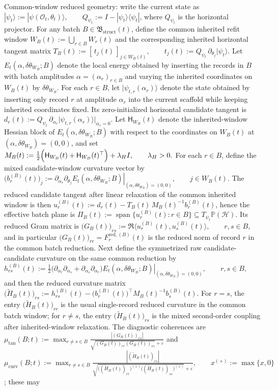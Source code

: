 \documentclass[11pt]{article}
\begin{document}
Common-window reduced geometry: write the current state as \(|\psi_t\rangle:=|\psi(\mathcal O_t,\theta_t)\rangle, \qquad Q_{\psi_t}:=I-|\psi_t\rangle\langle \psi_t|\), where \(Q_{\psi_t}\) is the horizontal projector. For any batch \(B\in \mathfrak B_{\mathrm{struct}}(t)\), define the common inherited refit window \(W_B(t):=\bigcup_{r\in B} W_r(t)\) and the corresponding inherited horizontal tangent matrix \(T_B(t):=[\,t_j(t)\,]_{j\in W_B(t)}, \qquad t_j(t):=Q_{\psi_t}\,\partial_{\theta_j}|\psi_t\rangle\). Let \(E_t(\alpha,\delta\theta_{W_B};B)\) denote the local energy obtained by inserting the records in \(B\) with batch amplitudes \(\alpha=(\alpha_r)_{r\in B}\) and varying the inherited coordinates on \(W_B(t)\) by \(\delta\theta_{W_B}\). For each \(r\in B\), let \(|\psi_{t,r}(\alpha_r)\rangle\) denote the state obtained by inserting only record \(r\) at amplitude \(\alpha_r\) into the current scaffold while keeping inherited coordinates fixed. Its zero-initialized horizontal candidate tangent is \(d_r(t):=Q_{\psi_t}\,\partial_{\alpha_r}|\psi_{t,r}(\alpha_r)\rangle\Big|_{\alpha_r=0}\). Let \(\mathsf H_{W_B}(t)\) denote the inherited-window Hessian block of \(E_t(\alpha,\delta\theta_{W_B};B)\) with respect to the coordinates on \(W_B(t)\) at \((\alpha,\delta\theta_{W_B})=(0,0)\), and set \(M_B(t):=\frac12\Bigl(\mathsf H_{W_B}(t)+\mathsf H_{W_B}(t)^\top\Bigr)+\lambda_H I, \qquad \lambda_H>0.\) For each \(r\in B\), define the mixed candidate-window curvature vector by \(\bigl(b_r^{(B)}(t)\bigr)_j:=\left.\partial_{\alpha_r}\partial_{\theta_j} E_t(\alpha,\delta\theta_{W_B};B)\right|_{(\alpha,\delta\theta_{W_B})=(0,0)}, \qquad j\in W_B(t)\). The reduced candidate tangent after linear relaxation of the common inherited window is then \(u_r^{(B)}(t):=d_r(t)-T_B(t)\,M_B(t)^{-1}b_r^{(B)}(t)\), hence the effective batch plane is \(\Pi_B(t):=\operatorname{span}\{u_r^{(B)}(t):r\in B\}\subseteq T_{\psi_t}\mathbb{P}(\mathcal H)\). Its reduced Gram matrix is \(\bigl(G_B(t)\bigr)_{rs}:=\Re\langle u_r^{(B)}(t),u_s^{(B)}(t)\rangle, \qquad r,s\in B\), and in particular \(\bigl(G_B(t)\bigr)_{rr}=F_r^{\mathrm{red},(B)}(t)\) is the reduced norm of record \(r\) in the common batch reduction. Next define the symmetrized raw candidate-candidate curvature on the same common reduction by \(h_{rs}^{(B)}(t):=\frac12 \left. \bigl( \partial_{\alpha_r}\partial_{\alpha_s} + \partial_{\alpha_s}\partial_{\alpha_r} \bigr) E_t(\alpha,\delta\theta_{W_B};B) \right|_{(\alpha,\delta\theta_{W_B})=(0,0)}, \qquad r,s\in B,\) and then the reduced curvature matrix \(\bigl(\widetilde H_B(t)\bigr)_{rs}:=h_{rs}^{(B)}(t)-\bigl(b_r^{(B)}(t)\bigr)^\top M_B(t)^{-1} b_s^{(B)}(t)\). For \(r=s\), the entry \(\bigl(\widetilde H_B(t)\bigr)_{rr}\) is the usual single-record reduced curvature in the common batch window; for \(r\neq s\), the entry \(\bigl(\widetilde H_B(t)\bigr)_{rs}\) is the mixed second-order coupling after inherited-window relaxation. The diagnostic coherences are \(\mu_{\mathrm{tan}}(B;t):=\max_{r\neq s\in B} \frac{|(G_B(t))_{rs}|} {\sqrt{(G_B(t))_{rr}(G_B(t))_{ss}}+\varepsilon}\) and \(\mu_{\mathrm{curv}}(B;t):=\max_{r\neq s\in B} \frac{|(\widetilde H_B(t))_{rs}|} {\sqrt{\bigl((\widetilde H_B(t))_{rr}\bigr)^{(+)} \bigl((\widetilde H_B(t))_{ss}\bigr)^{(+)} }+\varepsilon}, \qquad x^{(+)}:=\max\{x,0\}\); these may 
\end{document}
